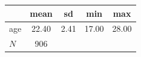 {
\def\sym#1{\ifmmode^{#1}\else\(^{#1}\)\fi}
\begin{tabular}{l*{1}{cccc}}
\toprule
            &        mean&          sd&         min&         max\\
\midrule
age         &       22.40&        2.41&       17.00&       28.00\\
\midrule
\(N\)       &         906&            &            &            \\
\bottomrule
\end{tabular}
}
